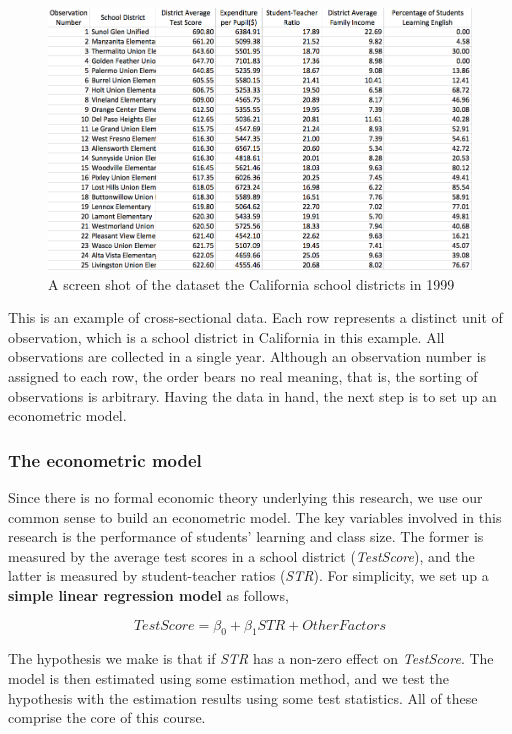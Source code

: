 \documentclass[a4paper,11pt]{article}
\begin{document}
\begin{figure}[htbp]
\centering
\includegraphics[width=1.0\textwidth]{figure/table1_1.png}
\caption{\label{fig:orge691f85}
A screen shot of the dataset the California school districts in 1999}
\end{figure}

This is an example of cross-sectional data. Each row represents a
distinct unit of observation, which is a school district in California
in this example. All observations are collected in a single
year. Although an observation number is assigned to each row, the
order bears no real meaning, that is, the sorting of observations is
arbitrary. Having the data in hand, the next step is to set up an
econometric model.

\subsubsection*{The econometric model}
\label{sec:org83593ed}

Since there is no formal economic theory underlying this research, we
use our common sense to build an econometric model. The key variables
involved in this research is the performance of students' learning and
class size. The former is measured by the average test scores in a
school district (\emph{TestScore}), and the latter is measured by student-teacher
ratios (\emph{STR}). For simplicity, we set up a \textbf{simple linear regression
model} as follows,

\[ TestScore = \beta_0 + \beta_1 STR + OtherFactors  \]

The hypothesis we make is that if \emph{STR} has a non-zero effect on
\emph{TestScore}. The model is then estimated using some estimation method,
and we test the hypothesis with the estimation results using some test
statistics. All of these comprise the core of this course.
\end{document}
